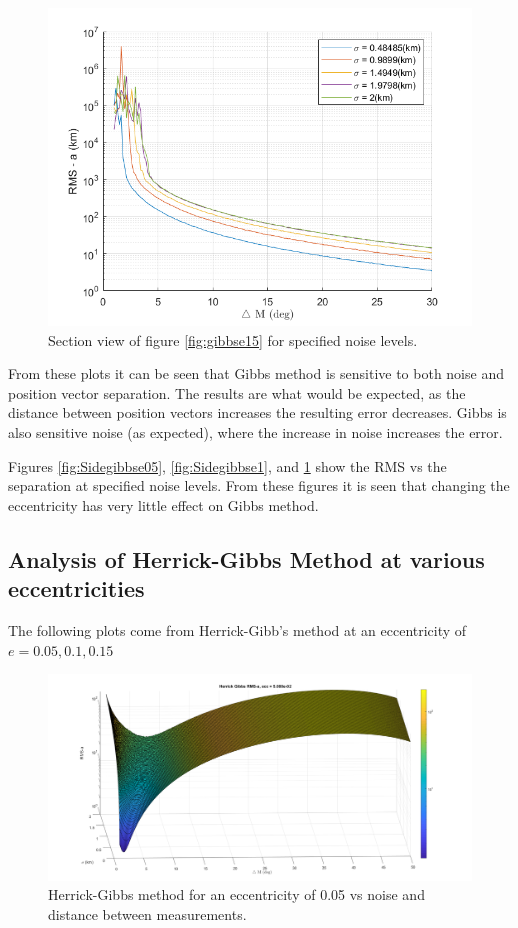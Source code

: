 \documentclass[12pt]{article}
\begin{document}
\begin{figure}[H]
	\centering
	\includegraphics[width=0.7\linewidth]{gibbs_e_15_side}
	\caption{Section view of figure \ref{fig:gibbse15} for specified noise levels.}
	\label{fig:Sidegibbse15}
\end{figure}

	From these plots it can be seen that Gibbs method is sensitive to both noise and position vector separation. The results are what would be expected, as the distance between position vectors increases the resulting error decreases. Gibbs is also sensitive noise (as expected), where the increase in noise increases the error. \par
	
	Figures \ref{fig:Sidegibbse05}, \ref{fig:Sidegibbse1}, and \ref{fig:Sidegibbse15} show the RMS vs the separation at specified noise levels. From these figures it is seen that changing the eccentricity has very little effect on Gibbs method. 

	\subsection{Analysis of Herrick-Gibbs Method at various eccentricities}
		The following plots come from Herrick-Gibb's method at an eccentricity of $e=0.05,0.1,0.15$
		\begin{figure}[H]
		\centering
		\includegraphics[width=0.7\linewidth]{herrickgibbs_e_05}
		\caption{Herrick-Gibbs method for an eccentricity of 0.05 vs noise and distance between measurements.}
		\label{fig:herrickgibbse05}
	\end{figure}
\end{document}
